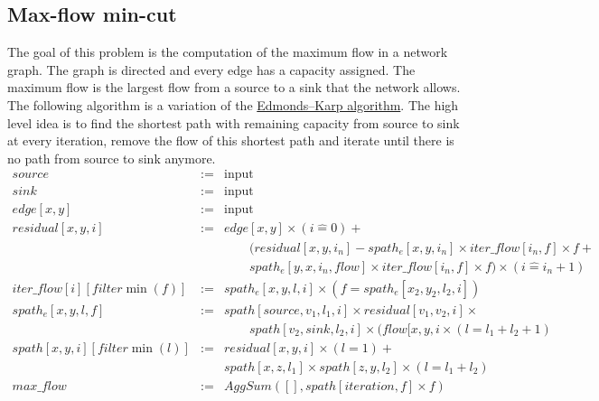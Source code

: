 \documentclass[10pt]{article}
\begin{document}
\subsection{Max-flow min-cut}
The goal of this problem is the computation of the maximum flow in a network graph.
The graph is directed and every edge has a capacity assigned.
The maximum flow is the largest flow from a source to a sink that the network allows.
The following algorithm is a variation of the \href{http://en.wikipedia.org/wiki/Edmonds-Karp_algorithm}{Edmonds–Karp algorithm}. The high level idea is to find the shortest path with remaining capacity from source to sink at every iteration, remove the flow of this shortest path and iterate until there is no path from source to sink anymore.
\[\begin{array}{rcl}
source &:=& \text{input} \\
sink &:=& \text{input} \\
edge[x,y] &:=& \text{input} \\
residual[x,y,i] &:=& edge[x,y] \times (i \hat= 0) + \\
&&\qquad (residual[x,y,i_n] - spath_e[x,y,i_n] \times iter\_flow[i_n,f] \times f + \\
&&\qquad spath_e[y,x,i_n,flow] \times iter\_flow[i_n,f] \times f) \times (i \hat= i_n + 1)\\
iter\_flow[i][filter \min(f)] &:=& spath_e[x,y,l,i] \times (f = spath_e[x_2,y_2,l_2,i]) \\
spath_e[x,y,l,f] &:=& spath[source,v_1,l_1,i] \times residual[v_1,v_2,i] \times\\
&&\qquad  spath[v_2,sink,l_2,i] \times (flow[x,y,i\times (l = l_1 + l_2 + 1) \\ 
spath[x,y,i][filter \min(l)] &:=& residual[x,y,i] \times (l = 1) +\\
&& spath[x,z,l_1] \times spath[z,y,l_2] \times (l = l_1 + l_2) \\
max\_flow &:=& AggSum([], spath[iteration, f] \times f)
\end{array}\]
\end{document}
